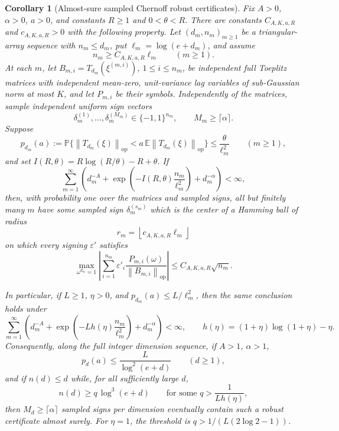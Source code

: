 \documentclass[11pt]{amsart}
\numberwithin{equation}{section}
\newtheorem{corollary}[theorem]{Corollary}
\theoremstyle{definition}
\theoremstyle{remark}
\newcommand{\op}{\mathrm{op}}
\newcommand{\Prob}{\mathbb P}
\newcommand{\Exp}{\mathbb E}
\newcommand{\norm}[1]{\left\lVert #1\right\rVert}
\newcommand{\eps}{\varepsilon}
\begin{document}
\begin{corollary}[Almost-sure sampled Chernoff robust certificates]
\label{cor:normalizer-tail-chernoff-borel-sampled}
Fix \(A>0\), \(\alpha>0\), \(a>0\), and constants \(R\ge1\) and
\(0<\theta<R\).  There are constants \(C_{A,K,a,R}\) and \(c_{A,K,a,R}>0\)
with the following property.  Let \((d_m,n_m)_{m\ge1}\) be a triangular-array
sequence with \(n_m\le d_m\), put \(\ell_m=\log(e+d_m)\), and assume
\[
  n_m\ge C_{A,K,a,R}\ell_m \qquad(m\ge1).
\]
At each \(m\), let \(B_{m,i}=T_{d_m}(\xi^{(m,i)})\), \(1\le i\le n_m\), be
independent full Toeplitz matrices with independent mean-zero, unit-variance
lag variables of sub-Gaussian norm at most \(K\), and let \(P_{m,i}\) be their
symbols.  Independently of the matrices, sample independent uniform sign
vectors
\[
  \delta_m^{(1)},\ldots,\delta_m^{(M_m)}\in\{-1,1\}^{n_m},
  \qquad M_m\ge \lceil\alpha\rceil .
\]
Suppose
\[
  p_{d_m}(a):=
  \Prob\{\norm{T_{d_m}(\xi)}_{\op}
      <a\,\Exp\norm{T_{d_m}(\xi)}_{\op}\}
  \le \frac{\theta}{\ell_m^2}
  \qquad(m\ge1),
\]
and set \(I(R,\theta)=R\log(R/\theta)-R+\theta\).  If
\[
  \sum_{m=1}^\infty
  \left(d_m^{-A}
  +\exp\left(-I(R,\theta)\frac{n_m}{\ell_m^2}\right)
  +d_m^{-\alpha}\right)<\infty,
\]
then, with probability one over the matrices and sampled signs, all but
finitely many \(m\) have some sampled sign \(\delta_m^{(s_m)}\) which is the
center of a Hamming ball of radius
\[
  r_m=\left\lfloor c_{A,K,a,R}\ell_m\right\rfloor
\]
on which every signing \(\eps'\) satisfies
\[
  \max_{\omega^{d_m}=1}
  \left|\sum_{i=1}^{n_m}\eps'_i
  \frac{P_{m,i}(\omega)}{\norm{B_{m,i}}_{\op}}\right|
  \le C_{A,K,a,R}\sqrt{n_m}.
\]

In particular, if \(L\ge1\), \(\eta>0\), and
\(p_{d_m}(a)\le L/\ell_m^2\), then the same conclusion holds under
\[
  \sum_{m=1}^\infty
  \left(d_m^{-A}
  +\exp\left(-Lh(\eta)\frac{n_m}{\ell_m^2}\right)
  +d_m^{-\alpha}\right)<\infty,
  \qquad h(\eta)=(1+\eta)\log(1+\eta)-\eta .
\]
Consequently, along the full integer dimension sequence, if \(A>1\),
\(\alpha>1\),
\[
  p_d(a)\le \frac{L}{\log^2(e+d)}
  \qquad(d\ge1),
\]
and if \(n(d)\le d\) while, for all sufficiently large \(d\),
\[
  n(d)\ge q\,\log^3(e+d)
  \qquad\text{for some } q>\frac1{Lh(\eta)},
\]
then \(M_d\ge\lceil\alpha\rceil\) sampled signs per dimension eventually contain
such a robust certificate almost surely.  For \(\eta=1\), the threshold is
\(q>1/(L(2\log2-1))\).
\end{corollary}
\end{document}
